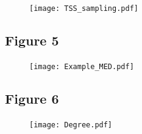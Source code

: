 \documentclass[12pt]{article}
\begin{document}
\begin{figure}[ht!]
	\centering\texttt{[image: TSS\_sampling.pdf]}
\end{figure}

\newpage
\subsection*{Figure 5}

\begin{figure}[ht!]
	\centering\texttt{[image: Example\_MED.pdf]}
\end{figure}

\newpage
\subsection*{Figure 6}

\begin{figure}[ht!]
	\centering\texttt{[image: Degree.pdf]}
\end{figure}
\end{document}
